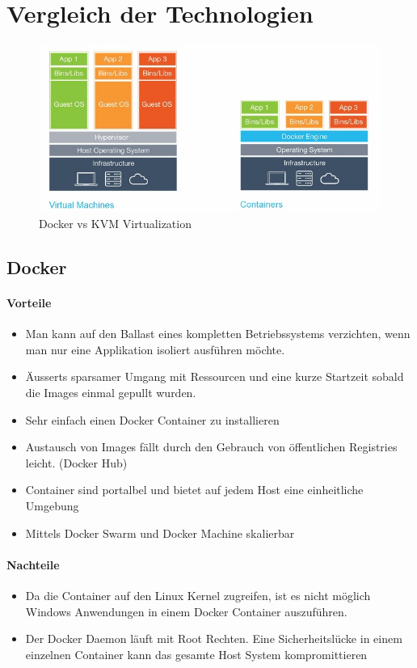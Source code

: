 \section{Vergleich der Technologien}
\begin{figure}[h]
\centering
\includegraphics[width=0.7\linewidth]{images/docker_virtualization}
\caption{Docker vs KVM Virtualization}
\label{fig:dockervirtualization}
\end{figure}


\subsection{Docker}
\paragraph{Vorteile}
\begin{itemize}
	\item Man kann auf den Ballast eines kompletten Betriebssystems verzichten, wenn man nur eine Applikation isoliert ausführen möchte.
	\item Äusserts sparsamer Umgang mit Ressourcen und eine kurze Startzeit	sobald die Images einmal gepullt wurden.
	\item Sehr einfach einen Docker Container zu installieren
	\item Austausch von Images fällt durch den Gebrauch von öffentlichen Registries leicht. (Docker Hub)
	\item Container sind portalbel und bietet auf jedem Host eine einheitliche Umgebung
	\item Mittels Docker Swarm und Docker Machine skalierbar
\end{itemize}
\paragraph{Nachteile}
\begin{itemize}
	\item Da die Container auf den Linux Kernel zugreifen, ist es nicht möglich Windows Anwendungen in einem Docker Container auszuführen.
	\item Der Docker Daemon läuft mit Root Rechten. Eine Sicherheitslücke in einem einzelnen Container kann das gesamte Host System kompromittieren
\end{itemize}

